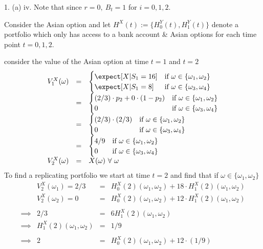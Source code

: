 \documentclass[11pt,a4paper]{article}
\begin{document}
\begin{answer}{1. (a) iv.}
  Note that since $r=0,\ B_t=1$ for $i=0,1,2$.
  \par Consider the Asian option and let $H^X(t):=\{H_0^Y(t),H_1^Y(t)\}$ denote a portfolio which only has access to a bank account \& Asian options for each time point $t=0,1,2$.
  \par consider the value of the Asian option at time $t=1$ and $t=2$
  \[\begin{array}{rcl}
    V_1^X(\omega)&=&\begin{cases}
      \expect[X|S_1=16]&\text{if }\omega\in\{\omega_1,\omega_2\}\\
      \expect[X|S_1=8]&\text{if }\omega\in\{\omega_3,\omega_4\}
    \end{cases}\\
    &=&\begin{cases}
      (2/3)\cdot p_2+0\cdot(1-p_2)&\text{if }\omega\in\{\omega_1,\omega_2\}\\
      0&\text{if }\omega\in\{\omega_3,\omega_4\}
    \end{cases}\\
    &=&\begin{cases}
      (2/3)\cdot(2/3)&\text{if }\omega\in\{\omega_1,\omega_2\}\\
      0&\text{if }\omega\in\{\omega_3,\omega_4\}
    \end{cases}\\
    &=&\begin{cases}
      4/9&\text{if }\omega\in\{\omega_1,\omega_2\}\\
      0&\text{if }\omega\in\{\omega_3,\omega_4\}
    \end{cases}\\
    V_2^X(\omega)&=&X(\omega)\ \forall\ \omega
  \end{array}\]
  To find a replicating portfolio we start at time $t=2$ and find that if $\omega\in\{\omega_1,\omega_2\}$
  \[\begin{array}{rrcl}
    &V_2^X(\omega_1)=2/3&=&H_0^X(2)(\omega_1,\omega_2)+18\cdot H_1^X(2)(\omega_1,\omega_2)\\
    &V_2^X(\omega_2)=0&=&H_0^X(2)(\omega_1,\omega_2)+12\cdot H_1^X(2)(\omega_1,\omega_2)\\\\
    \implies&2/3&=&6H_1^X(2)(\omega_1,\omega_2)\\
    \implies&H_1^X(2)(\omega_1,\omega_2)&=&1/9\\\\
    \implies&2&=&H_0^X(2)(\omega_1,\omega_2)+12\cdot(1/9)\\

\end{array}\]
\end{answer}
\end{document}
